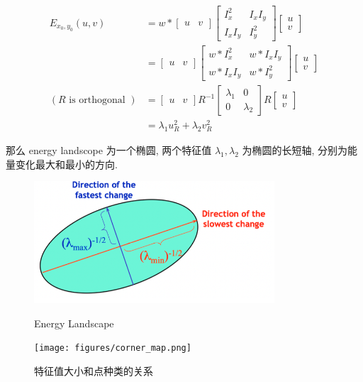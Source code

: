 \begin{equation}
    \renewcommand{\arraystretch}{0.85}
    \begin{aligned}
    E_{x_0, y_0}(u,v) &= w \ast \begin{bmatrix} u & v \end{bmatrix} \begin{bmatrix} I_x^2 & I_xI_y \\ I_xI_y & I_y^2 \end{bmatrix} \begin{bmatrix} u \\ v \end{bmatrix} \\
    &= \begin{bmatrix} u & v \end{bmatrix} \begin{bmatrix} w \ast I_x^2 & w \ast I_xI_y \\ w \ast I_xI_y & w \ast I_y^2 \end{bmatrix} \begin{bmatrix} u \\ v \end{bmatrix} \\
    (R \text{ is orthogonal })&= \begin{bmatrix} u & v \end{bmatrix} R^{-1} \begin{bmatrix} \lambda_1 & 0\\ 0 & \lambda_2 \end{bmatrix} R \begin{bmatrix} u \\ v \end{bmatrix} \\
    &= \lambda_1 u_R^2 + \lambda_2 v_R^2
    \end{aligned}
\end{equation}

那么 energy landscope 为一个椭圆, 两个特征值 $\lambda_1, \lambda_2$ 为椭圆的长短轴, 分别为能量变化最大和最小的方向.
\begin{figure}[htbp]
    \centering
    \begin{minipage}[t]{0.4\textwidth}
        \centering
        \includegraphics[width=0.8\textwidth]{figures/energy_landscope.png}
        \caption{Energy Landscape}
    \end{minipage}
    \begin{minipage}[t]{0.5\textwidth}
        \centering
        \texttt{[image: figures/corner\_map.png]}
        \caption{特征值大小和点种类的关系}
    \end{minipage}
\end{figure}

